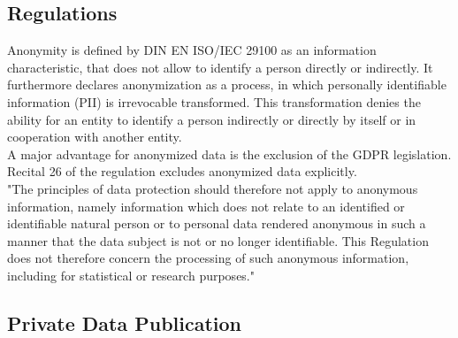     \subsection{Regulations}
        \label{subsec:related:law}
        Anonymity is defined by DIN EN ISO/IEC 29100 as an information characteristic, that does not allow to identify a person directly or indirectly\cite{german_institute_for_standardization_din_2020}. It furthermore declares anonymization as a process, in which personally identifiable information (PII) is irrevocable transformed. This transformation denies the ability for an entity to identify a person indirectly or directly by itself or in cooperation with another entity\cite{german_institute_for_standardization_din_2020}.\\
        
        A major advantage for anonymized data is the exclusion of the GDPR legislation. Recital 26 of the regulation excludes anonymized data explicitly.\\ 
        "The principles of data protection should therefore not apply to anonymous information, namely information which does not relate to an identified or identifiable natural person or to personal data rendered anonymous in such a manner that the data subject is not or no longer identifiable. This Regulation does not therefore concern the processing of such anonymous information, including for statistical or research purposes."\cite{european_union_regulation_2016}
        
    \subsection{Private Data Publication}
        \label{subsec:related:private_data_analysis}
    
